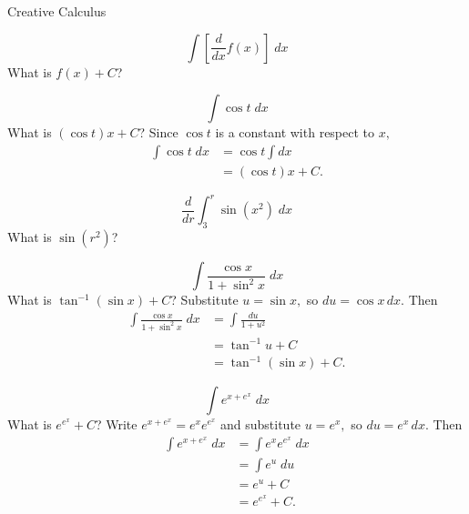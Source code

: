 \documentclass{article}
\begin{document}
\begin{category}{Creative Calculus}

  \begin{clue}[say]
    \[ \int \left[ \frac{d}{dx} f(x) \right] \; dx \]
  \response
    What is $f(x) + C$?
  \end{clue}

  \begin{clue}[say]
    \[ \int \cos t \; dx \]
  \response
    What is $(\cos t)x + C$?
  \solution
    Since $\cos t$ is a constant with respect to $x,$
    \begin{align*}
    \int \cos t \; dx
    &= \cos t \int dx \\
    &= (\cos t)x + C.
    \end{align*}
  \end{clue}

  \begin{clue}[say]
    \[ \frac{d}{dr} \int_{3}^{r} \sin (x^{2}) \; dx \]
  \response
    What is $\sin (r^{2})$?
  \end{clue}

  \begin{clue}[say]
    \[ \int \frac{\cos x}{1 + \sin^{2} x} \; dx \]
  \response
    What is $\tan^{-1} (\sin x) + C$?
  \solution
    Substitute $u=\sin x,$ so $du=\cos x\,dx.$ Then
    \begin{align*}
    \int \frac{\cos x}{1 + \sin^{2} x} \; dx
    &= \int \frac{du}{1+u^{2}} \\
    &= \tan^{-1} u + C \\
    &= \tan^{-1} (\sin x) + C.
    \end{align*}
  \end{clue}

  \begin{clue}[say]
    \[ \int e^{x+e^{x}} \; dx \]
  \response
    What is $e^{e^{x}} + C$?
  \solution
    Write $e^{x+e^{x}}=e^{x}e^{e^{x}}$ and substitute $u=e^{x},$ so $du=e^{x}\,dx.$ Then
    \begin{align*}
    \int e^{x+e^{x}} \; dx
    &= \int e^{x}e^{e^{x}} \; dx \\
    &= \int e^{u} \; du \\
    &= e^{u} + C \\
    &= e^{e^{x}} + C.
    \end{align*}
  \end{clue}

\end{category}
\end{document}
